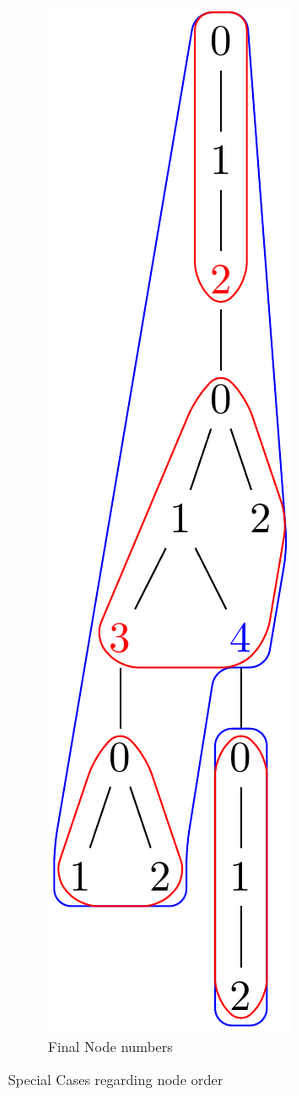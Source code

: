\documentclass{article}
\begin{document}
\begin{figure}[H]
\begin{subfigure}{2.5cm}
		\includegraphics[scale=0.21]{F3C3Tree}
		\caption{Final Node numbers}
		\label{factory:subim3}
	\end{subfigure}

\caption{Special Cases regarding node order}
\label{factory:images4}
\end{figure}
\end{document}

